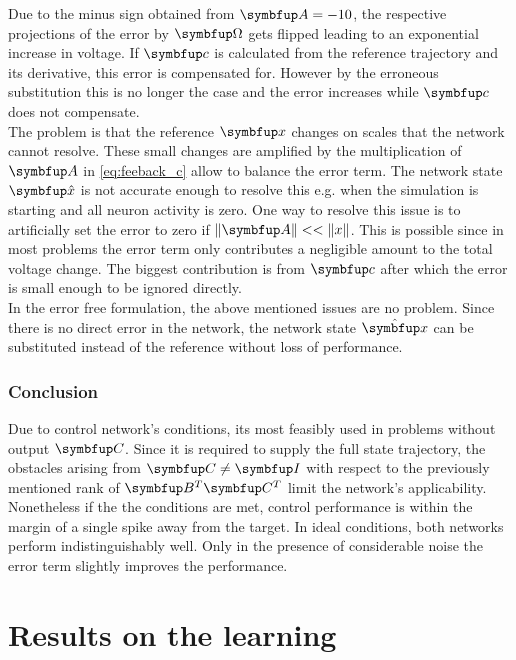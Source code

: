 Due to the minus sign obtained from $\bmu{A} = -10$, the respective projections of the error by $\bmu{\Omega}$ gets flipped leading to an exponential increase in voltage. If $\bmu{c}$ is calculated from the reference trajectory and its derivative, this error is compensated for. However by the erroneous substitution this is no longer the case and the error increases while $\bmu{c}$ does not compensate.\\
The problem is that the reference $\bmu{x}$ changes on scales that the network cannot resolve. These small changes are amplified by the multiplication of $\bmu{A}$ in \cref{eq:feeback_c} allow to balance the error term. The network state $\bmu{\hat{x}}$ is not accurate enough to resolve this e.g. when the simulation is starting and all neuron activity is zero.
One way to resolve this issue is to artificially set the error to zero if $\|\bmu{A}\|<<\|x\|$. This is possible since in most problems the error term only contributes a negligible amount to the total voltage change. The biggest contribution is from $\bmu{c}$ after which the error is small enough to be ignored directly.\\
In the error free formulation, the above mentioned issues are no problem. Since there is no direct error in the network, the network state $\hat{\bmu{x}}$ can be substituted instead of the reference without loss of performance.\\



\subsubsection{Conclusion}

Due to control network's conditions, its most feasibly used in problems without output $\bmu{C}$. Since it is required to supply the full state trajectory, the obstacles arising from $\bmu{C} \neq \bmu{I}$ with respect to the previously mentioned rank of $\bmu{B}^T\bmu{C}^T$ limit the network's applicability.\\
Nonetheless if the the conditions are met, control performance is within the margin of a single spike away from the target.
In ideal conditions, both networks perform indistinguishably well. Only in the presence of considerable noise the error term slightly improves the performance.

\section{Results on the learning}\label{sec:res_combined_learning}

